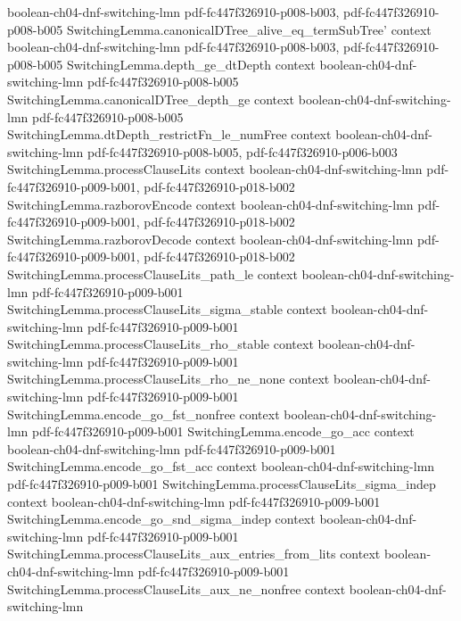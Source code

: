 \begin{theorem}
  {boolean-ch04-dnf-switching-lmn}
  {pdf-fc447f326910-p008-b003,
    pdf-fc447f326910-p008-b005}
\proofstep
  {SwitchingLemma.canonicalDTree_alive_eq_termSubTree'}
  {context}
  {boolean-ch04-dnf-switching-lmn}
  {pdf-fc447f326910-p008-b003,
    pdf-fc447f326910-p008-b005}
\proofstep
  {SwitchingLemma.depth_ge_dtDepth}
  {context}
  {boolean-ch04-dnf-switching-lmn}
  {pdf-fc447f326910-p008-b005}
\proofstep
  {SwitchingLemma.canonicalDTree_depth_ge}
  {context}
  {boolean-ch04-dnf-switching-lmn}
  {pdf-fc447f326910-p008-b005}
\proofstep
  {SwitchingLemma.dtDepth_restrictFn_le_numFree}
  {context}
  {boolean-ch04-dnf-switching-lmn}
  {pdf-fc447f326910-p008-b005,
    pdf-fc447f326910-p006-b003}
\proofstep
  {SwitchingLemma.processClauseLits}
  {context}
  {boolean-ch04-dnf-switching-lmn}
  {pdf-fc447f326910-p009-b001,
    pdf-fc447f326910-p018-b002}
\proofstep
  {SwitchingLemma.razborovEncode}
  {context}
  {boolean-ch04-dnf-switching-lmn}
  {pdf-fc447f326910-p009-b001,
    pdf-fc447f326910-p018-b002}
\proofstep
  {SwitchingLemma.razborovDecode}
  {context}
  {boolean-ch04-dnf-switching-lmn}
  {pdf-fc447f326910-p009-b001,
    pdf-fc447f326910-p018-b002}
\proofstep
  {SwitchingLemma.processClauseLits_path_le}
  {context}
  {boolean-ch04-dnf-switching-lmn}
  {pdf-fc447f326910-p009-b001}
\proofstep
  {SwitchingLemma.processClauseLits_sigma_stable}
  {context}
  {boolean-ch04-dnf-switching-lmn}
  {pdf-fc447f326910-p009-b001}
\proofstep
  {SwitchingLemma.processClauseLits_rho_stable}
  {context}
  {boolean-ch04-dnf-switching-lmn}
  {pdf-fc447f326910-p009-b001}
\proofstep
  {SwitchingLemma.processClauseLits_rho_ne_none}
  {context}
  {boolean-ch04-dnf-switching-lmn}
  {pdf-fc447f326910-p009-b001}
\proofstep
  {SwitchingLemma.encode_go_fst_nonfree}
  {context}
  {boolean-ch04-dnf-switching-lmn}
  {pdf-fc447f326910-p009-b001}
\proofstep
  {SwitchingLemma.encode_go_acc}
  {context}
  {boolean-ch04-dnf-switching-lmn}
  {pdf-fc447f326910-p009-b001}
\proofstep
  {SwitchingLemma.encode_go_fst_acc}
  {context}
  {boolean-ch04-dnf-switching-lmn}
  {pdf-fc447f326910-p009-b001}
\proofstep
  {SwitchingLemma.processClauseLits_sigma_indep}
  {context}
  {boolean-ch04-dnf-switching-lmn}
  {pdf-fc447f326910-p009-b001}
\proofstep
  {SwitchingLemma.encode_go_snd_sigma_indep}
  {context}
  {boolean-ch04-dnf-switching-lmn}
  {pdf-fc447f326910-p009-b001}
\proofstep
  {SwitchingLemma.processClauseLits_aux_entries_from_lits}
  {context}
  {boolean-ch04-dnf-switching-lmn}
  {pdf-fc447f326910-p009-b001}
\proofstep
  {SwitchingLemma.processClauseLits_aux_ne_nonfree}
  {context}
  {boolean-ch04-dnf-switching-lmn}

\end{theorem}
